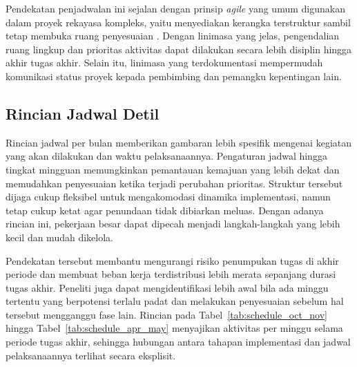 Pendekatan penjadwalan ini sejalan dengan prinsip \textit{agile} yang umum digunakan dalam proyek rekayasa kompleks, yaitu menyediakan kerangka terstruktur sambil tetap membuka ruang penyesuaian \autocite{kreuzberger2023mlops}. Dengan linimasa yang jelas, pengendalian ruang lingkup dan prioritas aktivitas dapat dilakukan secara lebih disiplin hingga akhir tugas akhir. Selain itu, linimasa yang terdokumentasi mempermudah komunikasi status proyek kepada pembimbing dan pemangku kepentingan lain.



\vspace{-0.5cm}

\subsection{Rincian Jadwal Detil}

Rincian jadwal per bulan memberikan gambaran lebih spesifik mengenai kegiatan yang akan dilakukan dan waktu pelaksanaannya. Pengaturan jadwal hingga tingkat mingguan memungkinkan pemantauan kemajuan yang lebih dekat dan memudahkan penyesuaian ketika terjadi perubahan prioritas. Struktur tersebut dijaga cukup fleksibel untuk mengakomodasi dinamika implementasi, namun tetap cukup ketat agar penundaan tidak dibiarkan meluas. Dengan adanya rincian ini, pekerjaan besar dapat dipecah menjadi langkah-langkah yang lebih kecil dan mudah dikelola.

Pendekatan tersebut membantu mengurangi risiko penumpukan tugas di akhir periode dan membuat beban kerja terdistribusi lebih merata sepanjang durasi tugas akhir. Peneliti juga dapat mengidentifikasi lebih awal bila ada minggu tertentu yang berpotensi terlalu padat dan melakukan penyesuaian sebelum hal tersebut mengganggu fase lain. Rincian pada Tabel~\ref{tab:schedule_oct_nov} hingga Tabel~\ref{tab:schedule_apr_may} menyajikan aktivitas per minggu selama periode tugas akhir, sehingga hubungan antara tahapan implementasi dan jadwal pelaksanaannya terlihat secara eksplisit.



\vspace{-0.5cm}



\vspace{-0.5cm}



\vspace{-0.5cm}

